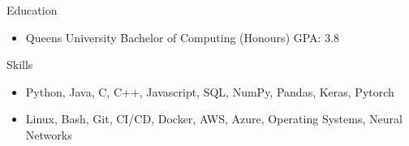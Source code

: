 \documentclass[]{mcdowellcv}
\begin{document}
\begin{cvsection}{Education}
	\begin{cvsubsection}{}{}{}
		\begin{itemize}
			\item Queen\textquotesingle{}s University \textbar{} Bachelor of Computing (Honours) \textbar{} GPA: 3.8
		\end{itemize}
	\end{cvsubsection}
\end{cvsection}
\begin{cvsection}{Skills}
	\begin{cvsubsection}{}{}{}
		\begin{itemize}
			\item  Python, Java, C, C++, Javascript, SQL, NumPy, Pandas, Keras, Pytorch
			\item  Linux, Bash, Git, CI/CD, Docker, AWS, Azure, Operating Systems, Neural Networks
		\end{itemize}
	\end{cvsubsection}
\end{cvsection}
\ 
\end{document}
